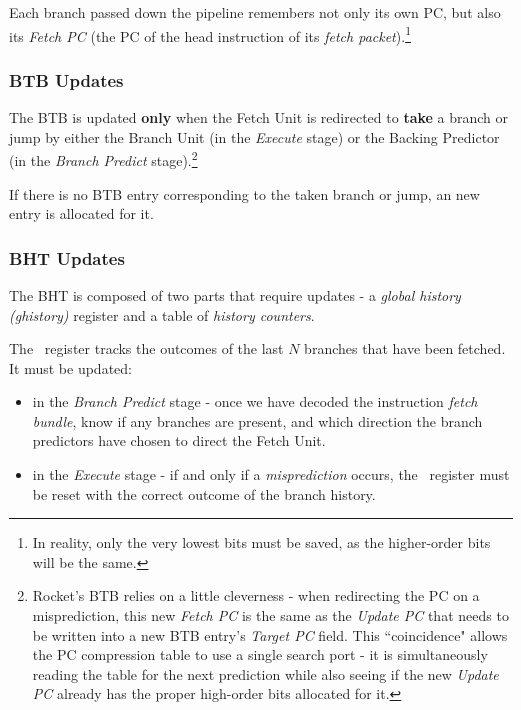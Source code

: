 Each branch passed down the pipeline remembers not only its own PC, but also its {\em Fetch PC} (the PC of the head instruction of its {\em fetch packet}).\footnote{In reality, only the very lowest bits must be saved, as the higher-order bits will be the same.}  



\subsubsection{BTB Updates}

The BTB is updated {\bf only} when the Fetch Unit is redirected to {\bf take} a branch or jump by either the Branch Unit (in the {\em Execute} stage) or the Backing Predictor (in the {\em Branch Predict} stage).\footnote{Rocket's BTB relies on a little cleverness - when redirecting the PC on a misprediction, this new {\em Fetch PC } is the same as the {\em Update PC} that needs to be written into a new BTB entry's {\em Target PC} field. This ``coincidence" allows the PC compression table to use a single search port - it is simultaneously reading the table for the next prediction while also seeing if the new {\em Update PC} already has the proper high-order bits allocated for it.}

If there is no BTB entry corresponding to the taken branch or jump, an new entry is allocated for it.

\subsubsection{BHT Updates}

The BHT is composed of two parts that require updates - a {\em global history (ghistory)} register and a table of {\em history counters}. 

The \ghistory\ register tracks the outcomes of the last $N$ branches that have been fetched. It must be updated:

\begin{itemize}
\item in the {\em Branch Predict} stage - once we have decoded the instruction {\em fetch bundle}, know if any branches are present, and which direction the branch predictors have chosen to direct the Fetch Unit.
\item in the {\em Execute} stage - if and only if a {\em misprediction} occurs, the \ghistory\ register must be reset with the correct outcome of the branch history.
\end{itemize}

